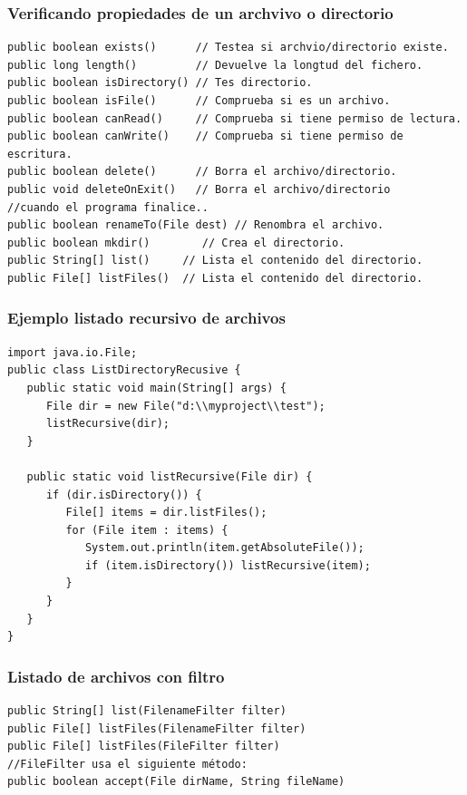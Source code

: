 \documentclass{beamer}
\begin{document}
\begin{frame}[fragile]
\frametitle{Verificando propiedades de un archvivo o directorio}
\begin{footnotesize}
\begin{verbatim}
public boolean exists()      // Testea si archvio/directorio existe.
public long length()         // Devuelve la longtud del fichero.
public boolean isDirectory() // Tes directorio.
public boolean isFile()      // Comprueba si es un archivo.
public boolean canRead()     // Comprueba si tiene permiso de lectura.
public boolean canWrite()    // Comprueba si tiene permiso de escritura.
public boolean delete()      // Borra el archivo/directorio.
public void deleteOnExit()   // Borra el archivo/directorio
//cuando el programa finalice..
public boolean renameTo(File dest) // Renombra el archivo.
public boolean mkdir()        // Crea el directorio.
public String[] list()     // Lista el contenido del directorio.
public File[] listFiles()  // Lista el contenido del directorio.
\end{verbatim}
\end{footnotesize}
\end{frame}

\begin{frame}[fragile]
\frametitle{Ejemplo listado recursivo de archivos}
\begin{small}
\begin{verbatim}
import java.io.File;
public class ListDirectoryRecusive {
   public static void main(String[] args) {
      File dir = new File("d:\\myproject\\test");  
      listRecursive(dir);
   }
   
   public static void listRecursive(File dir) {
      if (dir.isDirectory()) {
         File[] items = dir.listFiles();
         for (File item : items) {
            System.out.println(item.getAbsoluteFile());
            if (item.isDirectory()) listRecursive(item);  
         }
      }
   }
}
\end{verbatim}
\end{small}
\end{frame}

\begin{frame}[fragile]
\frametitle{Listado de archivos con filtro}
\begin{verbatim}
public String[] list(FilenameFilter filter)
public File[] listFiles(FilenameFilter filter)
public File[] listFiles(FileFilter filter)
//FileFilter usa el siguiente método:
public boolean accept(File dirName, String fileName)
\end{verbatim}
\end{frame}
\end{document}
